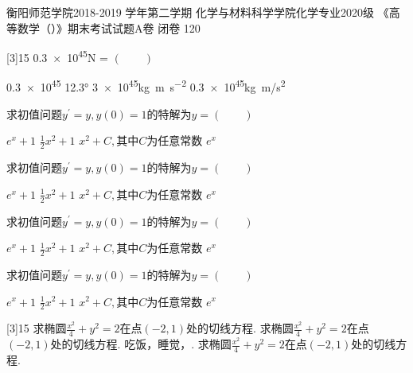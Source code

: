\documentclass[addtable,twoside,12pt]{hnuexam}
\begin{document}
\examinformation%
{衡阳师范学院2018-2019 学年第二学期}%
{化学与材料科学学院化学专业2020级}%
{《高等数学（）》期末考试试题A卷}%
{闭卷}%
{120}%

\vspace{-1.2em}

\sectiongradetable

\begin{questions}
	{15}
	\question
	\num{.3e45}\si{\newton} = \hfill $(\qquad)$

	\begin{oneparchoices}
		\choice \num{.3e45}
		\choice	\ang{12.3}
		\choice \num{3e45}\si{\kilo\gram\metre\per\square\second}
		\CorrectChoice \num{.3e45}\si{kg.m/s^2}
	\end{oneparchoices}

	\question
		求初值问题$y^\prime=y,y(0)=1$的特解为$y=$\hfill $(\qquad)$
	
		\begin{oneparchoices}
			\choice $e^x+1$
			\choice	$\frac{1}{2}x^2+1$
			\choice $x^2+C,\text{其中}C$为任意常数
			\CorrectChoice $e^x$
		\end{oneparchoices}

\question
	求初值问题$y^\prime=y,y(0)=1$的特解为$y=$\hfill $(\qquad)$

	\begin{oneparchoices}
		\choice $e^x+1$
		\choice	$\frac{1}{2}x^2+1$
		\choice $x^2+C,\text{其中}C$为任意常数
		\CorrectChoice $e^x$
	\end{oneparchoices}


\question
	求初值问题$y^\prime=y,y(0)=1$的特解为$y=$\hfill $(\qquad)$

	\begin{oneparchoices}
		\choice $e^x+1$
		\choice	$\frac{1}{2}x^2+1$
		\choice $x^2+C,\text{其中}C$为任意常数
		\CorrectChoice $e^x$
	\end{oneparchoices}


	\question
		求初值问题$y^\prime=y,y(0)=1$的特解为$y=$\hfill $(\qquad)$
	
		\begin{oneparchoices}
			\choice $e^x+1$
			\choice	$\frac{1}{2}x^2+1$
			\choice $x^2+C,\text{其中}C$为任意常数
			\CorrectChoice $e^x$
		\end{oneparchoices}

	{15}
	\question 求椭圆$\frac{x^2}{4}+y^2=2$在点$(-2,1)$处的切线方程\fillin[$x-2y+4=0$][1.5in].
	\question 求椭圆$\frac{x^2}{4}+y^2=2$在点$(-2,1)$处的切线方程\fillin[$x-2y+4=0$][2in].
	\question 吃饭，睡觉，\fillin[打豆豆][0.5in].	
	\question 求椭圆$\frac{x^2}{4}+y^2=2$在点$(-2,1)$处的切线方程\fillin[$x-2y+4=0$][2in].
	

\end{questions}
\end{document}
